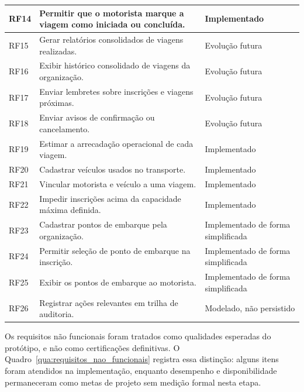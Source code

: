 \documentclass[a4paper,12pt]{article}
\begin{document}
{\begin{longtable}{|>{\raggedright\arraybackslash}p{1.25cm}|>{\raggedright\arraybackslash}p{9.1cm}|>{\raggedright\arraybackslash}p{3.7cm}|}
RF14 & Permitir que o motorista marque a viagem como iniciada ou concluída. & Implementado \\ \hline
RF15 & Gerar relatórios consolidados de viagens realizadas. & Evolução futura \\ \hline
RF16 & Exibir histórico consolidado de viagens da organização. & Evolução futura \\ \hline
RF17 & Enviar lembretes sobre inscrições e viagens próximas. & Evolução futura \\ \hline
RF18 & Enviar avisos de confirmação ou cancelamento. & Evolução futura \\ \hline
RF19 & Estimar a arrecadação operacional de cada viagem. & Implementado \\ \hline
RF20 & Cadastrar veículos usados no transporte. & Implementado \\ \hline
RF21 & Vincular motorista e veículo a uma viagem. & Implementado \\ \hline
RF22 & Impedir inscrições acima da capacidade máxima definida. & Implementado \\ \hline
RF23 & Cadastrar pontos de embarque pela organização. & Implementado de forma simplificada \\ \hline
RF24 & Permitir seleção de ponto de embarque na inscrição. & Implementado de forma simplificada \\ \hline
RF25 & Exibir os pontos de embarque ao motorista. & Implementado de forma simplificada \\ \hline
RF26 & Registrar ações relevantes em trilha de auditoria. & Modelado, não persistido \\ \hline
\end{longtable}
}
\FloatBarrier

Os requisitos não funcionais foram tratados como qualidades esperadas do protótipo, e não como certificações definitivas. O Quadro~\ref{qua:requisitos_nao_funcionais} registra essa distinção: alguns itens foram atendidos na implementação, enquanto desempenho e disponibilidade permaneceram como metas de projeto sem medição formal nesta etapa.
\end{document}
